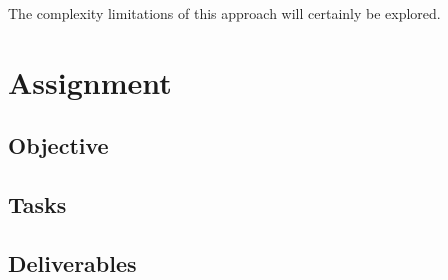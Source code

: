 \documentclass[a4paper, 11pt]{article}
\begin{document}
The complexity limitations of this approach will certainly be explored. 

\section{Assignment}
\subsection{Objective}

\subsection{Tasks}


\subsection{Deliverables}



\end{document}

